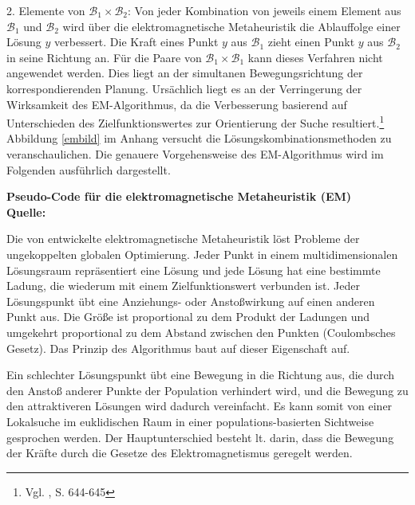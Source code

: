 \documentclass[a4paper,12pt,normalheadings,footexclude,headinclude,liststotoc,nochapterprefix,onecolumn,oneside,parskip,pointlessnumbers]{scrreprt}
\begin{document}
2. Elemente von $\mathcal{B}_{1}\times \mathcal{B}_{2}$: Von jeder Kombination von jeweils einem Element aus $\mathcal{B}_{1}$ und $\mathcal{B}_{2}$ wird über die elektromagnetische Metaheuristik die Ablauffolge einer Lösung $y$ verbessert. Die Kraft eines Punkt $y$ aus $\mathcal{B}_{1}$ zieht einen Punkt $y$ aus $\mathcal{B}_{2}$ in seine Richtung an. Für die Paare von $\mathcal{B}_{1}\times \mathcal{B}_{1}$ kann dieses Verfahren nicht angewendet werden. Dies liegt an der simultanen Bewegungsrichtung der korrespondierenden Planung. Ursächlich liegt es an der Verringerung der Wirksamkeit des EM-Algorithmus, da die Verbesserung basierend auf Unterschieden des Zielfunktionswertes zur Orientierung der Suche resultiert.\footnote{Vgl. \cite{debels2006hybrid}, S. 644-645} Abbildung \ref{embild} im Anhang versucht die Lösungskombinationsmethoden zu veranschaulichen. Die genauere Vorgehensweise des EM-Algorithmus wird im Folgenden ausführlich dargestellt.


\begin{algorithm}[H]
\textbf{Pseudo-Code für die elektromagnetische Metaheuristik (EM)}\\
{\footnotesize \textbf{Quelle:} \cite{birbil2003electromagnetism}}
\end{algorithm}

Die von \cite{birbil2003electromagnetism} entwickelte elektromagnetische Metaheuristik löst Probleme der ungekoppelten globalen Optimierung. Jeder Punkt in einem multidimensionalen Lösungsraum repräsentiert eine Lösung und jede Lösung hat eine bestimmte Ladung, die wiederum mit einem Zielfunktionswert verbunden ist. Jeder Lösungspunkt übt eine Anziehungs- oder Anstoßwirkung auf einen anderen Punkt aus. Die Größe ist proportional zu dem Produkt der Ladungen und umgekehrt proportional zu dem Abstand zwischen den Punkten (Coulombsches Gesetz). Das Prinzip des Algorithmus baut auf dieser Eigenschaft auf.

Ein schlechter Lösungspunkt übt eine Bewegung in die Richtung aus, die durch den Anstoß anderer Punkte der Population verhindert wird, und die Bewegung zu den attraktiveren Lösungen wird dadurch vereinfacht. Es kann somit von einer Lokalsuche im euklidischen Raum in einer populations-basierten Sichtweise gesprochen werden. Der Hauptunterschied besteht lt. \cite{debels2006hybrid} darin, dass die Bewegung der Kräfte durch die Gesetze des Elektromagnetismus geregelt werden.
\end{document}
